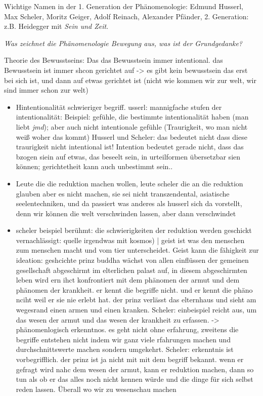 \documentclass[a4paper, emulatestandardclasses]{scrartcl}
\begin{document}
Wichtige Namen in der 1. Generation der Phänomenologie: Edmund Husserl, Max Scheler, Moritz Geiger, Adolf Reinach, Alexander Pfänder, 2. Generation: z.B. Heidegger mit \emph{Sein und Zeit}.\newline

\noindent \emph{Was zeichnet die Phänomenologie Bewegung aus, was ist der Grundgedanke?}

Theorie des Bewusstseins: Das das Bewusstsein immer intentional. das Bewusstsein ist immer shcon gerichtet auf -> es gibt kein bewusstsein das erst bei sich ist, und dann auf etwas gerichtet ist (nicht wie kommen wir zur welt, wir sind immer schon zur welt)\newline



\begin{itemize}
  \item Hintentionalität schwieriger begriff. usserl: mannigfache stufen der intentionalität: Beispiel: gefühle, die bestimmte intentionalität haben (man liebt \emph{jmd}); aber auch nicht intentionale gefühle (Traurigkeit, wo man nicht weiß woher das kommt) Husserl und Scheler: das bedeutet nicht dass diese traurigkeit nicht intentional ist! Intention bedeutet gerade nicht, dass das bzogen siein auf etwas, das beseelt sein, in urteilformen übersetzbar sien können; gerichtetheit kann auch unbestimmt sein..
  \item Leute die die reduktion machen wollen, leute scheler die an die reduktion glauben aber es nicht machen, sie sei nicht transzendental, asiatische seelentechniken, und da passiert was anderes als husserl sich da vorstellt, denn wir können die welt verschwinden lassen, aber dann verschwindet 
  \item scheler beispiel berühmt: die schwierigkeiten der reduktion werden geschickt vernachlässigt: quelle irgendwas mit kosmos) | geist ist was den menschen zum menschen macht und vom tier unterscheidet. Geist kann die fähigkeit zur ideation: geshcichte prinz buddha wächst von allen einflüssen der gemeinen gesellschaft abgeschirmt im elterlichen palast auf, in diesem abgeschirmten leben wird ern ihct konfrontiert mit dem phänomen der armut und dem phänomen der krankheit. er kennt die begriffe nicht. und er kennt die phäno nciht weil er sie nie erlebt hat. der prinz verlässt das elternhaus und sieht am wegesrand einen armen und einen kranken. Scheler: einbeispiel reicht aus, um das wesen der armut und das wesen der krankheit zu erfassen. -> phänomenlogisch erkenntnos. es geht nicht ohne erfahrung, zweitens die begriffe entstehen nicht indem wir ganz viele rfahrungen machen und durchschnittswerte machen sondern umgekehrt. Scheler: erkenntnis ist vorbegrifflich. der prinz ist ja nicht mit mit dem begriff bekannt. wenn er gefragt wird nahc dem wesen der armut, kann er reduktion machen, dann so tun als ob er das alles noch nicht kennen würde und die dinge für sich selbst reden lassen. Überall wo wir zu wesenschau machen 

\end{itemize}
\end{document}
